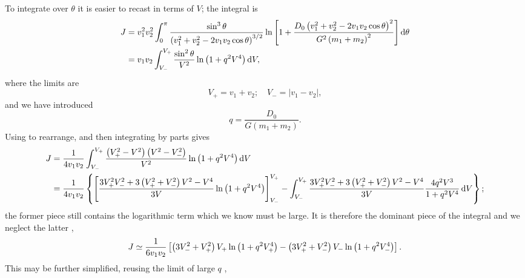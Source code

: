 To integrate over $\theta$ it is easier to recast in terms of $V$; the integral is
\begin{align}
J = {} & v_1^2 v_2^2 \int_{0}^{\pi}{\frac{\sin^3\theta}{\left(v_1^2 + v_2^2 - 2v_1 v_2 \cos\theta\right)^{3/2}}\ln\left[1 + \frac{D_0\left(v_1^2 + v_2^2 - 2v_1 v_2 \cos\theta\right)^2}{G^2\left(m_1 + m_2\right)^2}\right]}\,\mathrm{d}{\theta} \\
 = {} & v_1 v_2 \int_{V_-}^{V_+}{\frac{\sin^2\theta}{V^2}\ln\left(1 + q^2V^4\right)}\,\mathrm{d}{V},
\end{align}
where the limits are
\begin{equation}
V_+ = v_1 + v_2; \quad V_- = |v_1 - v_2|,
\end{equation}
and we have introduced
\begin{equation}
q = \frac{D_0}{G\left(m_1+m_2\right)}.
\end{equation}
Using  to rearrange, and then integrating by parts gives
\begin{align}
J = {} & \frac{1}{4 v_1 v_2} \int_{V_-}^{V_+}{\frac{\left(V_+^2 - V^2\right)\left(V^2 - V_-^2\right)}{V^2}\ln\left(1 + q^2V^4\right)}\,\mathrm{d}{V} \\
 = {} & \frac{1}{4 v_1 v_2} \left\{\left[\frac{3V_+^2V_-^2 + 3\left(V_+^2 + V_-^2\right)V^2 - V^4}{3V} \ln\left(1 + q^2V^4\right)\right]^{V_+}_{V_-} - \int_{V_-}^{V_+}{\frac{3V_+^2V_-^2 + 3\left(V_+^2 + V_-^2\right)V^2 - V^4}{3V}\frac{4q^2V^3}{1+ q^2V^4}}\,\mathrm{d}{V}\right\};
\end{align}
the former piece still contains the logarithmic term which we know must be large. It is therefore the dominant piece of the integral and we neglect the latter \citep{Chandrasekhar1941},
\begin{equation}
J \simeq \frac{1}{6 v_1 v_2} \left[\left(3V_-^2 + V_+^2\right)V_+\ln\left(1 + q^2V_+^4\right) - \left(3V_+^2 + V_-^2\right)V_-\ln\left(1 + q^2V_-^4\right)\right].
\end{equation}
This may be further simplified, reusing the limit of large $q$ \citep{Chandrasekhar1941,Chandrasekhar1941b},
